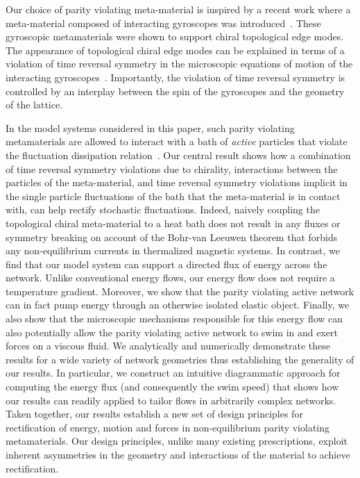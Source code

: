 \documentclass[
 preprint,
 preprintnumbers,
 amsmath,amssymb,
 aps,
 pre,
 longbibliography,
 superscriptaddress,
 10pt, twocolumn
]{revtex4-1}
\begin{document}
Our choice of parity violating meta-material is inspired by a recent work where a meta-material composed of interacting gyroscopes was introduced~\cite{Nash2015TopologicalMechanics}. These gyroscopic metamaterials were shown to support chiral topological edge modes. The appearance of topological chiral edge modes can be explained in terms of a violation of time reversal symmetry in the microscopic equations of motion of the interacting gyroscopes~\cite{Nash2015TopologicalMechanics,Mitchell2018AmorphousTopological}. Importantly, the violation of time reversal symmetry is controlled by an interplay between the spin of the gyroscopes and the geometry of the lattice.  %


In the model systems considered in this paper, such parity violating metamaterials are allowed to interact with a bath of \textit{active} particles that violate the fluctuation dissipation relation~\cite{Fodor2016HowFar}. Our central result shows how a combination of time reversal symmetry violations due to chirality, interactions between the particles of the meta-material, and time reversal symmetry violations implicit in the single particle fluctuations of the bath that the meta-material is in contact with, can help rectify stochastic fluctuations. Indeed, naively coupling the topological chiral meta-material to a heat bath does not result in any fluxes or symmetry breaking on account of the Bohr-van Leeuwen theorem that forbids any non-equilibrium currents in thermalized magnetic systems. In contrast, we find that our model system can support a directed flux of energy across the network. Unlike conventional energy flows, our energy flow does not require a temperature gradient. Moreover, we show that the {parity violating active} network can in fact pump energy through an otherwise isolated elastic object. Finally, we also show that the microscopic mechanisms responsible for this energy flow can also potentially allow the {parity violating active} network to swim in and exert forces on a viscous fluid. We analytically and numerically demonstrate these results for a wide variety of network geometries thus establishing the generality of our results. In particular, we construct an intuitive diagrammatic approach for computing the energy flux (and consequently the swim speed) that shows how our results can readily applied to tailor flows in arbitrarily complex networks. Taken together, our results establish a new set of design principles for rectification of energy, motion and forces in non-equilibrium parity violating metamaterials. Our design principles, unlike many existing prescriptions, exploit inherent asymmetries in the geometry and interactions of the material to achieve rectification.
\end{document}
